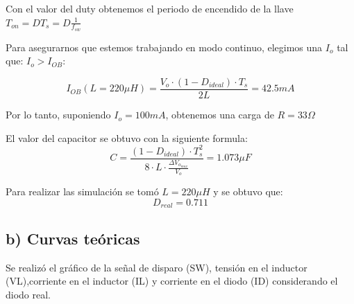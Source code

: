 \documentclass[e4_tp1_main.tex]{subfiles}
\begin{document}
Con el valor del duty obtenemos el periodo de encendido de la llave $T_{on}=D T_s=D \frac{1}{f_{sw}}$


Para asegurarnos que estemos trabajando en modo continuo, elegimos una $I_{o}$ tal que: $I_{o}>I_{OB}$:

\[
I_{OB}(L=220\mu H) = \frac{V_o \cdot (1-D_{ideal}) \cdot T_s}{2L} = 42.5mA
\]




Por lo tanto, suponiendo $I_o=100mA$, obtenemos una carga de $R=33\Omega$



El valor del capacitor se obtuvo con la siguiente formula:
$$C=\frac{(1-D_{ideal}) \cdot T_{s}^{2}}{8\cdot L\cdot \frac{\Delta V_{o_{max}}}{V_o}}=1.073\mu F$$

Para realizar las simulaci\'on se tom\'o  $L=220\mu H$ y se obtuvo que: 
$$D_{real}=0.711$$

\subsection*{b) Curvas teóricas}

Se realiz\'o el gr\'afico de la señal de disparo (SW), tensión en el inductor (VL),corriente en el inductor (IL) y corriente en el diodo (ID) considerando el diodo real. 
\end{document}
